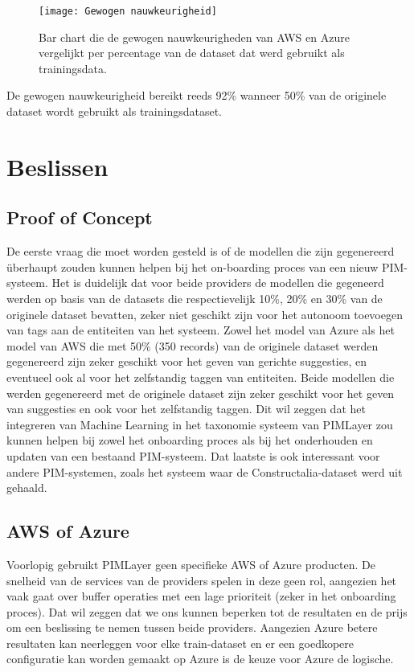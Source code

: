 \begin{figure}[h]
    \caption{Bar chart die de gewogen nauwkeurigheden van AWS en Azure vergelijkt per percentage van de dataset dat werd gebruikt als trainingsdata.}
    \centering
    \label{gewogen_nauwkeurigheid_chart}
    \texttt{[image: Gewogen nauwkeurigheid]}
\end{figure}

De gewogen nauwkeurigheid bereikt reeds 92\% wanneer 50\% van de originele dataset wordt gebruikt als trainingsdataset. 

\section{Beslissen}
\subsection{Proof of Concept}
De eerste vraag die moet worden gesteld is of de modellen die zijn gegenereerd überhaupt zouden kunnen helpen bij het on-boarding proces van een nieuw PIM-systeem. Het is duidelijk dat voor beide providers de modellen die gegeneerd werden op basis van de datasets die respectievelijk 10\%, 20\% en 30\% van de originele dataset bevatten, zeker niet geschikt zijn voor het autonoom toevoegen van tags aan de entiteiten van het systeem. Zowel het model van Azure als het model van AWS die met 50\% (350 records) van de originele dataset werden gegenereerd zijn zeker geschikt voor het geven van gerichte suggesties, en eventueel ook al voor het zelfstandig taggen van entiteiten. Beide modellen die werden gegenereerd met de originele dataset zijn zeker geschikt voor het geven van suggesties en ook voor het zelfstandig taggen. Dit wil zeggen dat het integreren van Machine Learning in het taxonomie systeem van PIMLayer zou kunnen helpen bij zowel het onboarding proces als bij het onderhouden en updaten van een bestaand PIM-systeem. Dat laatste is ook interessant voor andere PIM-systemen, zoals het systeem waar de Constructalia-dataset werd uit gehaald. 
\subsection{AWS of Azure}
Voorlopig gebruikt PIMLayer geen specifieke AWS of Azure producten. De snelheid van de services van de providers spelen in deze geen rol, aangezien het vaak gaat over buffer operaties met een lage prioriteit (zeker in het onboarding proces). Dat wil zeggen dat we ons kunnen beperken tot de resultaten en de prijs om een beslissing te nemen tussen beide providers. 
Aangezien Azure betere resultaten kan neerleggen voor elke train-dataset en er een goedkopere configuratie kan worden gemaakt op Azure is de keuze voor Azure de logische. 


